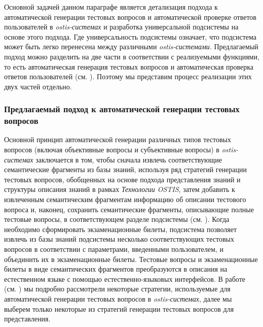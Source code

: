 Основной задачей данном параграфе является детализация подхода к автоматической генерации тестовых вопросов и автоматической проверке ответов пользователей в \textit{ostis-системах} и разработка универсальной подсистемы на основе этого подхода. Где универсальность подсистемы означает, что подсистема может быть легко перенесена между различными \textit{ostis-системами}. Предлагаемый подход можно разделить на две части в соответствии с реализуемыми функциями, то есть автоматическая генерация тестовых вопросов и автоматическая проверка ответов пользователей (см. ). Поэтому мы представим процесс реализации этих двух частей отдельно.

\subsubsection{Предлагаемый подход к автоматической генерации тестовых вопросов}
\label{subsubsec_proposed_approach_automatic_generation_test_questions}

Основной принцип автоматической генерации различных типов тестовых вопросов (включая объективные вопросы и субъективные вопросы) в \textit{ostis-системах} заключается в том, чтобы сначала извлечь соответствующие семантические фрагменты из базы знаний, используя ряд стратегий генерации тестовых вопросов, обобщенных на основе подхода представления знаний и структуры описания знаний в рамках \textit{Технологии OSTIS}, затем добавить к извлеченным семантическим фрагментам информацию об описании тестового вопроса и, наконец, сохранить семантические фрагменты, описывающие полные тестовые вопросы, в соответствующем разделе подсистемы (см. ). Когда необходимо сформировать экзаменационные билеты, подсистема позволяет извлечь из базы знаний подсистемы несколько соответствующих тестовых вопросов в соответствии с параметрами, введенными пользователем, и объединить их в экзаменационные билеты. Тестовые вопросы и экзаменационные билеты в виде семантических фрагментов преобразуются в описания на естественном языке с помощью естественно-языковых интерфейсов. В работе (см. ) мы подробно рассмотрели некоторые стратегии, используемые для автоматической генерации тестовых вопросов в \textit{ostis-системах}, далее мы выберем только некоторые из стратегий генерации тестовых вопросов для представления.

